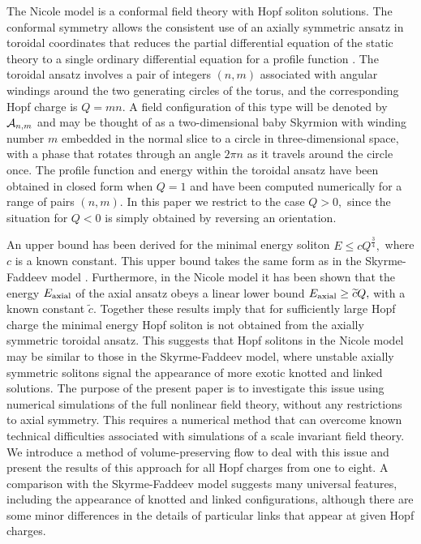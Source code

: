 \documentclass[12pt]{article}
\newcommand{\be}{\begin{equation}}
\newcommand{\ee}{\end{equation}}
\newcommand{\bphi}{\mbox{\boldmath $\phi$}}
\begin{document}

The Nicole model \cite{Ni} is a conformal field theory with 
Hopf soliton solutions. The conformal symmetry allows the consistent 
use of an axially symmetric ansatz in toroidal coordinates that reduces
the partial differential equation of the static theory to 
a single ordinary differential equation for a profile function \cite{BF}.
The toroidal ansatz involves a pair of integers $(n,m)$ 
associated with angular windings around the
two generating circles of the torus, and the corresponding Hopf charge is 
$Q=mn.$  A field configuration of this type will be denoted by 
${\cal A}_{n,m}$ and may be thought of as a two-dimensional baby Skyrmion
\cite{PSZ} with winding number $m$ embedded in the normal slice to a circle in
three-dimensional space, with a phase that rotates through an angle
$2\pi n$ as it travels around the circle once. 
The profile function and energy within the toroidal ansatz have been 
obtained \cite{Ni} in closed form when $Q=1$ and have been computed 
numerically \cite{ASVW} for a range of pairs $(n,m)$. 
In this paper we restrict to the case $Q>0,$ since
the situation for $Q<0$ is simply obtained by reversing an orientation.

An upper bound has been derived \cite{ASVW} for the minimal energy soliton 
$E\le cQ^\frac{3}{4},$ where $c$ is a known constant. This upper bound
takes the same form as in the Skyrme-Faddeev model \cite{LY}.
Furthermore, in the Nicole model it has been shown that the
energy  $E_{\rm axial}$ of the axial ansatz obeys a linear lower bound 
$E_{\rm axial}\ge \widetilde c Q,$ with a known constant $\widetilde c.$  
Together these results imply that for sufficiently large
Hopf charge the minimal energy Hopf soliton is not obtained from the 
axially symmetric toroidal ansatz. This suggests that Hopf solitons 
in the Nicole model may be similar to those in the Skyrme-Faddeev model,
where unstable axially symmetric solitons signal the appearance of
more exotic knotted and linked solutions. The purpose of the present
paper is to investigate this issue using numerical simulations of
the full nonlinear field theory, without any restrictions to axial
symmetry. This requires a numerical method that can overcome known
technical difficulties associated with simulations of a scale invariant
field theory. We introduce a method of volume-preserving
flow to deal with this issue and present the results of
this approach for all Hopf charges from one to eight.
 A comparison with the Skyrme-Faddeev
model suggests many universal features, including the appearance of
knotted and linked configurations, although there are some 
minor differences in the details of particular links that appear
at given Hopf charges.
\newpage 
\end{document}
